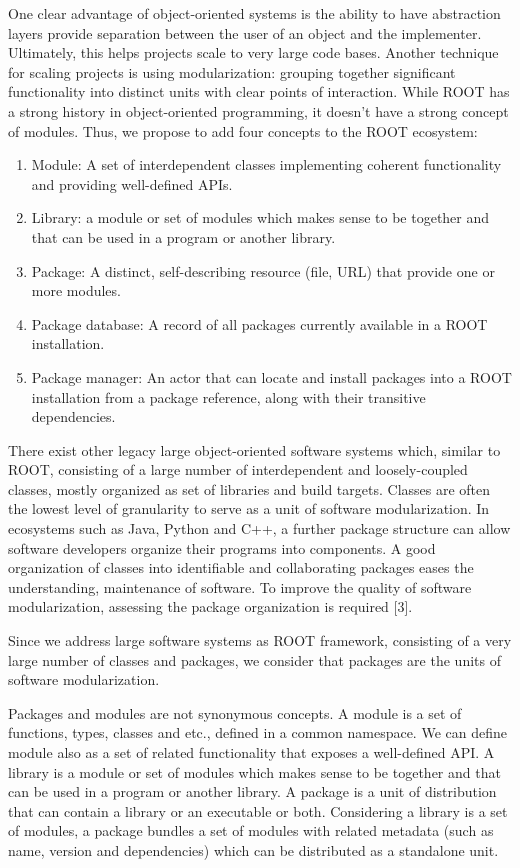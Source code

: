 \documentclass{webofc}
\begin{document}
One clear advantage of object-oriented systems is the ability to have abstraction layers provide separation between the user of an object and the implementer.  Ultimately, this helps projects scale to very large code bases.  Another technique for scaling projects is using modularization: grouping together significant functionality into distinct units with clear points of interaction.  While ROOT has a strong history in object-oriented programming, it doesn’t have a strong concept of modules.  Thus, we propose to add four concepts to the ROOT ecosystem:
\begin{enumerate}
\item Module: A set of interdependent classes implementing coherent functionality and providing well-defined APIs.
\item Library: a module or set of modules  which makes sense to be together and that can be used in a program or another library.
\item Package: A distinct, self-describing resource (file, URL) that provide one or more modules.
\item Package database: A record of all packages currently available in a ROOT installation.
\item Package manager: An actor that can locate and install packages into a ROOT installation from a package reference, along with their transitive dependencies.
\end{enumerate}
There exist other legacy large object-oriented software systems  which, similar to ROOT, consisting of a large number of interdependent  and loosely-coupled classes, mostly organized as set of libraries and build targets.  Classes are often the lowest level of granularity to serve as a unit of software modularization. In ecosystems such as Java,  Python and C++, a further package structure can allow software developers organize their programs into components. A good organization of classes into identifiable and collaborating packages eases the understanding, maintenance of software. To improve the quality of software modularization, assessing the package organization is required [3].

Since we address large software systems as ROOT framework, consisting of a very large number of classes and packages, we consider that packages are the units of software modularization. 

Packages and modules are not synonymous concepts.  A module is a set of functions, types, classes and etc., defined in a common namespace. We can define module also as a set of related functionality that exposes a well-defined API. A library is a module or set of modules  which makes sense to be together and that can be used in a program or another library. A package is a unit of distribution that can contain a library or an executable or both. Considering a library is a set of modules, a package bundles a set of modules with related metadata (such as name, version and dependencies) which can be distributed as a standalone unit.
\end{document}
